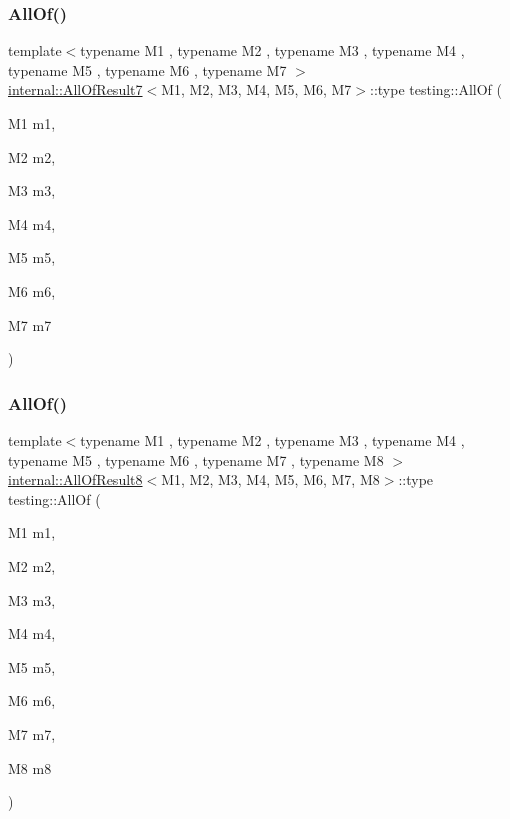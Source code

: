 \subsubsection{\texorpdfstring{AllOf()}{AllOf()}\hspace{0.1cm}{\footnotesize\ttfamily [6/9]}}
{\footnotesize\ttfamily template$<$typename M1 , typename M2 , typename M3 , typename M4 , typename M5 , typename M6 , typename M7 $>$ \\
\mbox{\hyperlink{structtesting_1_1internal_1_1AllOfResult7}{internal\+::\+All\+Of\+Result7}}$<$M1, M2, M3, M4, M5, M6, M7$>$\+::type testing\+::\+All\+Of (\begin{DoxyParamCaption}\item[{M1}]{m1,  }\item[{M2}]{m2,  }\item[{M3}]{m3,  }\item[{M4}]{m4,  }\item[{M5}]{m5,  }\item[{M6}]{m6,  }\item[{M7}]{m7 }\end{DoxyParamCaption})\hspace{0.3cm}{\ttfamily [inline]}}

\mbox{\label{namespacetesting_a7ec0bc4eca9805e85b9b34bbbf3d3ae2}} 
\subsubsection{\texorpdfstring{AllOf()}{AllOf()}\hspace{0.1cm}{\footnotesize\ttfamily [7/9]}}
{\footnotesize\ttfamily template$<$typename M1 , typename M2 , typename M3 , typename M4 , typename M5 , typename M6 , typename M7 , typename M8 $>$ \\
\mbox{\hyperlink{structtesting_1_1internal_1_1AllOfResult8}{internal\+::\+All\+Of\+Result8}}$<$M1, M2, M3, M4, M5, M6, M7, M8$>$\+::type testing\+::\+All\+Of (\begin{DoxyParamCaption}\item[{M1}]{m1,  }\item[{M2}]{m2,  }\item[{M3}]{m3,  }\item[{M4}]{m4,  }\item[{M5}]{m5,  }\item[{M6}]{m6,  }\item[{M7}]{m7,  }\item[{M8}]{m8 }\end{DoxyParamCaption})\hspace{0.3cm}{\ttfamily [inline]}}

